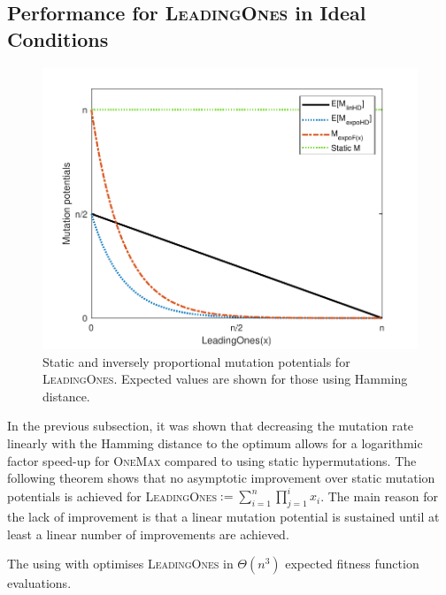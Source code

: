 \documentclass[lettersize,journal]{IEEEtran}
\begin{document}
\subsection{Performance for \textsc{LeadingOnes} in Ideal Conditions}
\begin{figure}[t!]
\centering
\includegraphics[width=\columnwidth]{b}
\caption{Static and inversely proportional  mutation potentials for \textsc{LeadingOnes}. Expected values are shown for those using Hamming distance.}
\label{fig:leadingones}
\end{figure}

In the previous subsection, it was shown that decreasing the mutation rate linearly with the Hamming distance to the optimum allows for a logarithmic factor speed-up for \textsc{OneMax} compared to using  static hypermutations. The following theorem shows that no asymptotic improvement over static mutation potentials is achieved for \textsc{LeadingOnes}$:= \sum_{i=1}^{n}\prod_{j=1}^{i}x_i$. The main reason for the lack of improvement is that a linear mutation potential is sustained until at least a linear number of improvements are achieved.


\begin{theorem} \label{th:linHD-LO}
The {\oneoneIA } using \IPHfcm{} with {\linHD } optimises \textsc{LeadingOnes} in $\Theta(n^3)$ expected fitness function evaluations.
\end{theorem}
\end{document}
